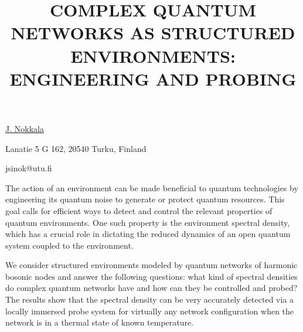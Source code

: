 \title{COMPLEX QUANTUM NETWORKS AS STRUCTURED ENVIRONMENTS: ENGINEERING AND PROBING}

\underline{J. Nokkala} 

{\normalsize{\vspace{-4mm}
Lanatie 5 G 162, 20540 Turku, Finland

\email jsinok@utu.fi}}

The action of an environment can be made beneficial to quantum technologies by engineering its quantum noise to generate or protect quantum resources. This goal calls for efficient ways to detect and control the relevant properties of quantum environments. One such property is the environment spectral density, which has a crucial role in dictating the reduced dynamics of an open quantum system coupled to the environment.

We consider structured environments modeled by quantum networks of harmonic bosonic nodes and answer the following questions: what kind of spectral densities do complex quantum networks have and how can they be controlled and probed? The results show that the spectral density can be very accurately detected via a locally immersed probe system for virtually any network configuration when the network is in a thermal state of known temperature.

\vspace{\baselineskip}

